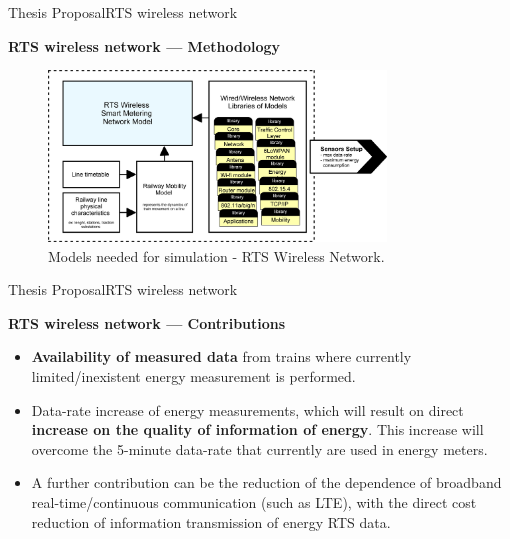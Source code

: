 \begin{frame}{Thesis Proposal}{RTS wireless network}
\begin{block}{\textbf{RTS wireless network --- Methodology}}

\begin{figure}[ht!]
	\centering
	\includegraphics[width=0.8\textwidth,keepaspectratio]{figures/40.Method/methodWireless}
	\caption{Models needed for simulation - RTS Wireless Network.}
\end{figure}

\end{block}
\end{frame}

\begin{frame}{Thesis Proposal}{RTS wireless network}
\begin{block}{\textbf{RTS wireless network --- Contributions}}
\begin{itemize}
\item \textbf{Availability of measured data} from trains where currently limited/inexistent energy measurement is performed.

\item Data-rate increase of energy measurements, which will result on direct \textbf{increase on the quality of information of energy}. This increase will overcome the 5-minute data-rate that currently are used in energy meters.

\item A further contribution can be the reduction of the dependence of broadband real-time/continuous communication (such as \ac{LTE}), with the direct cost reduction of information transmission of energy \ac{RTS} data.
\end{itemize}
\end{block}
\end{frame}

